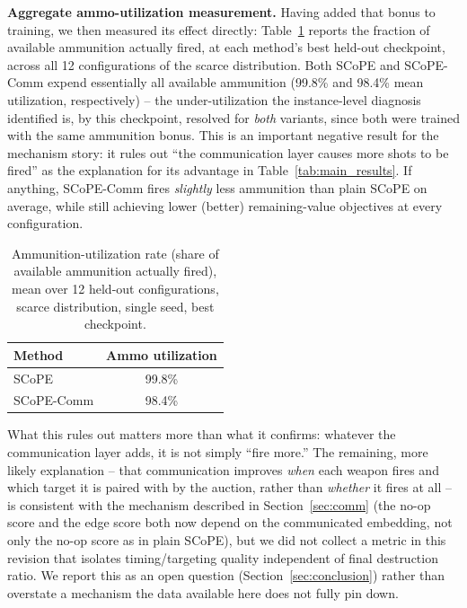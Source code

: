 \textbf{Aggregate ammo-utilization measurement.} Having added that bonus to training, we then measured its effect directly: Table~\ref{tab:coordination} reports the fraction of available ammunition actually fired, at each method's best held-out checkpoint, across all 12 configurations of the scarce distribution. Both SCoPE and SCoPE-Comm expend essentially all available ammunition (99.8\% and 98.4\% mean utilization, respectively) -- the under-utilization the instance-level diagnosis identified is, by this checkpoint, resolved for \emph{both} variants, since both were trained with the same ammunition bonus. This is an important negative result for the mechanism story: it rules out ``the communication layer causes more shots to be fired'' as the explanation for its advantage in Table~\ref{tab:main_results}. If anything, SCoPE-Comm fires \emph{slightly} less ammunition than plain SCoPE on average, while still achieving lower (better) remaining-value objectives at every configuration.

\begin{table}[htbp]
\centering
\small
\caption{Ammunition-utilization rate (share of available ammunition actually fired), mean over 12 held-out configurations, scarce distribution, single seed, best checkpoint.}
\label{tab:coordination}
\begin{tabular}{l|c}
\hline
\textbf{Method} & \textbf{Ammo utilization} \\ \hline
SCoPE & 99.8\% \\
SCoPE-Comm & 98.4\% \\ \hline
\end{tabular}
\end{table}

What this rules out matters more than what it confirms: whatever the communication layer adds, it is not simply ``fire more.'' The remaining, more likely explanation -- that communication improves \emph{when} each weapon fires and which target it is paired with by the auction, rather than \emph{whether} it fires at all -- is consistent with the mechanism described in Section~\ref{sec:comm} (the no-op score and the edge score both now depend on the communicated embedding, not only the no-op score as in plain SCoPE), but we did not collect a metric in this revision that isolates timing/targeting quality independent of final destruction ratio. We report this as an open question (Section~\ref{sec:conclusion}) rather than overstate a mechanism the data available here does not fully pin down.



